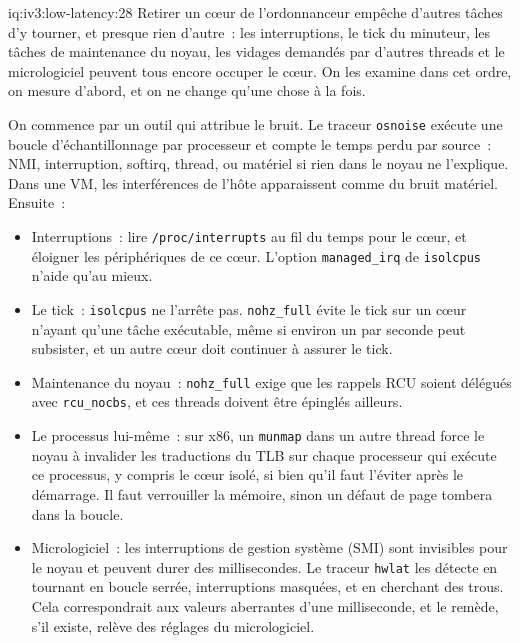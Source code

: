 \begin{solution}{iq:iv3:low-latency:28}
Retirer un cœur de l'ordonnanceur empêche d'autres tâches d'y tourner, et presque rien d'autre~: les interruptions, le tick du minuteur, les tâches de maintenance du noyau, les vidages demandés par d'autres threads et le micrologiciel peuvent tous encore occuper le cœur. On les examine dans cet ordre, on mesure d'abord, et on ne change qu'une chose à la fois.

On commence par un outil qui attribue le bruit. Le traceur \texttt{osnoise} exécute une boucle d'échantillonnage par processeur et compte le temps perdu par source~: NMI, interruption, softirq, thread, ou matériel si rien dans le noyau ne l'explique. Dans une VM, les interférences de l'hôte apparaissent comme du bruit matériel. Ensuite~:
\begin{itemize}
\item Interruptions~: lire \texttt{/proc/interrupts} au fil du temps pour le cœur, et éloigner les périphériques de ce cœur. L'option \texttt{managed\_irq} de \texttt{isolcpus} n'aide qu'au mieux.
\item Le tick~: \texttt{isolcpus} ne l'arrête pas. \texttt{nohz\_full} évite le tick sur un cœur n'ayant qu'une tâche exécutable, même si environ un par seconde peut subsister, et un autre cœur doit continuer à assurer le tick.
\item Maintenance du noyau~: \texttt{nohz\_full} exige que les rappels RCU soient délégués avec \texttt{rcu\_nocbs}, et ces threads doivent être épinglés ailleurs.
\item Le processus lui-même~: sur x86, un \texttt{munmap} dans un autre thread force le noyau à invalider les traductions du TLB sur chaque processeur qui exécute ce processus, y compris le cœur isolé, si bien qu'il faut l'éviter après le démarrage. Il faut verrouiller la mémoire, sinon un défaut de page tombera dans la boucle.
\item Micrologiciel~: les interruptions de gestion système (SMI) sont invisibles pour le noyau et peuvent durer des millisecondes. Le traceur \texttt{hwlat} les détecte en tournant en boucle serrée, interruptions masquées, et en cherchant des trous. Cela correspondrait aux valeurs aberrantes d'une milliseconde, et le remède, s'il existe, relève des réglages du micrologiciel.
\end{itemize}

\end{solution}

